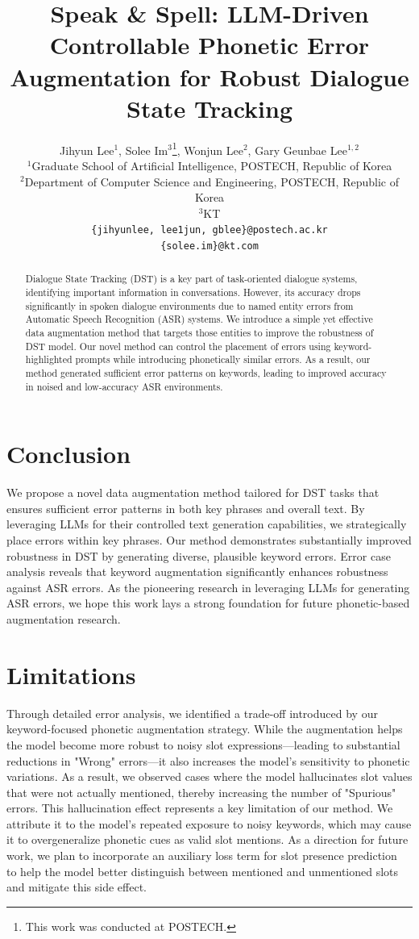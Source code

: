 \documentclass[11pt]{article}
\title{Speak \& Spell: LLM-Driven Controllable Phonetic Error Augmentation for
Robust Dialogue State Tracking
}
\author{Jihyun Lee$^1$, Solee Im$^3$\thanks{This work was conducted at POSTECH.}, Wonjun Lee$^2$, Gary Geunbae Lee$^{1,2}$ \\
  $^1$Graduate School of Artificial Intelligence, POSTECH, Republic of Korea\\
  $^2$Department of Computer Science and Engineering, POSTECH, Republic of Korea\\
  $^3$KT\\
  \texttt{\{jihyunlee, lee1jun, gblee\}@postech.ac.kr} \\
  \texttt{\{solee.im\}@kt.com}
}
\begin{document}
\maketitle
\begin{abstract}
Dialogue State Tracking (DST) is a key part of task-oriented dialogue systems, identifying important information in conversations. However, its accuracy drops significantly in spoken dialogue environments due to named entity errors from Automatic Speech Recognition (ASR) systems. We introduce a simple yet effective data augmentation method that targets those entities to improve the robustness of DST model. Our novel method can control the placement of errors using keyword-highlighted prompts while introducing phonetically similar errors. As a result, our method generated sufficient error patterns on keywords, leading to improved accuracy in noised and low-accuracy ASR environments.
\end{abstract}




\vspace{-4pt}
\section{Conclusion}
\vspace{-4pt}

We propose a novel data augmentation method tailored for DST tasks that ensures sufficient error patterns in both key phrases and overall text. By leveraging LLMs for their controlled text generation capabilities, we strategically place errors within key phrases. Our method demonstrates substantially improved robustness in DST by generating diverse, plausible keyword errors. Error case analysis reveals that keyword augmentation significantly enhances robustness against ASR errors.  As the pioneering research in leveraging LLMs for generating ASR errors, we hope this work lays a strong foundation for future phonetic-based augmentation research.

\section*{Limitations}

Through detailed error analysis, we identified a trade-off introduced by our keyword-focused phonetic augmentation strategy. While the augmentation helps the model become more robust to noisy slot expressions—leading to substantial reductions in "Wrong" errors—it also increases the model’s sensitivity to phonetic variations. As a result, we observed cases where the model hallucinates slot values that were not actually mentioned, thereby increasing the number of "Spurious" errors. This hallucination effect represents a key limitation of our method. We attribute it to the model's repeated exposure to noisy keywords, which may cause it to overgeneralize phonetic cues as valid slot mentions. As a direction for future work, we plan to incorporate an auxiliary loss term for slot presence prediction~\cite{trippy,kim2019efficient} to help the model better distinguish between mentioned and unmentioned slots and mitigate this side effect.
\end{document}
